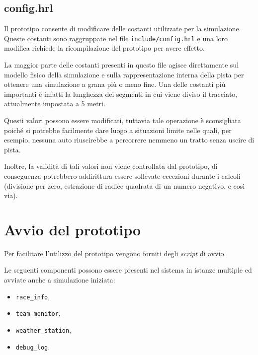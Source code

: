 \documentclass[a4paper]{report}
\begin{document}
\section*{config.hrl}
Il prototipo consente di modificare delle costanti utilizzate per la simulazione.
Queste costanti sono raggruppate nel file \texttt{include/config.hrl} e una loro modifica richiede la ricompilazione del prototipo per avere effetto.

La maggior parte delle costanti presenti in questo file agisce direttamente sul modello fisico della simulazione e sulla rappresentazione interna della pista per ottenere una simulazione a grana più o meno fine. Una delle costanti più importanti è infatti la lunghezza dei segmenti in cui viene diviso il tracciato, attualmente impostata a 5 metri.

Questi valori possono essere modificati, tuttavia tale operazione è sconsigliata poiché si potrebbe facilmente dare luogo a situazioni limite nelle quali, per esempio, nessuna auto riuscirebbe a percorrere nemmeno un tratto senza uscire di pista.

Inoltre, la validità di tali valori non viene controllata dal prototipo, di conseguenza potrebbero addirittura essere sollevate eccezioni durante i calcoli (divisione per zero, estrazione di radice quadrata di un numero negativo, e così via).


\chapter{Avvio del prototipo}
Per facilitare l'utilizzo del prototipo vengono forniti degli \textit{script} di avvio.

Le seguenti componenti possono essere presenti nel sistema in istanze multiple ed avviate anche a simulazione iniziata:
\begin{itemize}
\item \texttt{race\_info},
\item \texttt{team\_monitor},
\item \texttt{weather\_station},
\item \texttt{debug\_log}.
\end{itemize}
\end{document}
